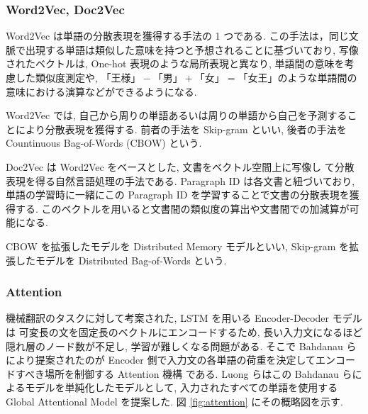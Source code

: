 \changeindent{0cm}
\subsubsection{Word2Vec, Doc2Vec}
\changeindent{2cm}

Word2Vec \cite{word2vec} は単語の分散表現を獲得する手法の 1 つである.
この手法は，同じ文脈で出現する単語は類似した意味を持つと予想されることに基づいており,
写像されたベクトルは, One-hot 表現のような局所表現と異なり, 単語間の意味を考慮した類似度測定や, $「王様」-「男」+「女」=「女王」$のような単語間の意味における演算などができるようになる.

Word2Vec では, 自己から周りの単語あるいは周りの単語から自己を予測することにより分散表現を獲得する.
前者の手法を Skip-gram といい, 後者の手法を Countinuous Bag-of-Words (CBOW) という.

Doc2Vec \cite{DBLP:journals/corr/LeM14} は Word2Vec をベースとした, 文書をベクトル空間上に写像し
て分散表現を得る自然言語処理の手法である.
Paragraph ID は各文書と紐づいており, 単語の学習時に一緒にこの Paragraph ID を学習することで文書の分散表現を獲得する.
このベクトルを用いると文書間の類似度の算出や文書間での加減算が可能になる.

CBOW を拡張したモデルを Distributed Memory モデルといい, Skip-gram を拡張したモデルを Distributed Bag-of-Words という.

\newpage
\changeindent{0cm}
\subsubsection{Attention}
\changeindent{2cm}

機械翻訳のタスクに対して考案された, LSTM を用いる Encoder-Decoder モデルは
可変長の文を固定長のベクトルにエンコードするため, 長い入力文になるほど隠れ層のノード数が不足し,
学習が難しくなる問題がある. そこで Bahdanau らにより提案されたのが Encoder 側で入力文の各単語の荷重を決定してエンコードすべき場所を制御する Attention 機構 \cite{attention} である.
Luong らはこの Bahdanau らによるモデルを単純化したモデルとして,
入力されたすべての単語を使用する Global Attentional Model \cite{attention_model} を提案した.
図 \ref{fig:attention} にその概略図を示す.

